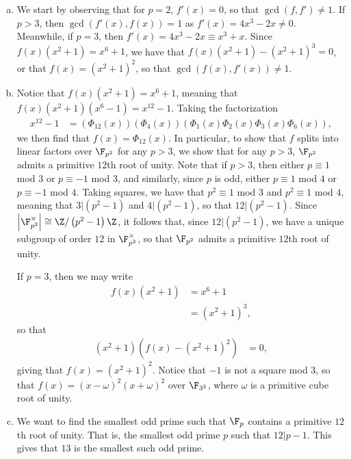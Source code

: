 \documentclass[10pt]{mypackage}
\begin{document}
\begin{solution}\hfill
  \begin{enumerate}[(a)]
    \item We start by observing that for $p = 2$, $f'(x) = 0$, so that $\gcd\left( f,f' \right)\neq 1$. If $p > 3$, then $\gcd\left( f'(x),f(x) \right) = 1$ as $f'(x) = 4x^3-2x\neq 0$. Meanwhile, if $p = 3$, then $f'(x) = 4x^3-2x \equiv x^3 + x$. Since $f(x)\left( x^2 + 1 \right) = x^{6}+1$, we have that $f(x)\left( x^2+1 \right)-\left( x^2+1 \right)^{3} = 0$, or that $f(x) = \left( x^2+1 \right)^{2}$, so that $\gcd\left( f(x),f'(x) \right) \neq 1$.
    \item Notice that $f(x)\left( x^2+1 \right) = x^{6}+1$, meaning that $f(x)\left( x^2+1 \right)\left( x^6-1 \right) = x^{12}-1$. Taking the factorization
      \begin{align*}
        x^{12}-1 &= \left( \Phi_{12}(x) \right)\left( \Phi_4(x) \right)\left( \Phi_1(x)\Phi_2(x)\Phi_3(x)\Phi_6(x) \right),
      \end{align*}
      we then find that $f(x) = \Phi_{12}(x)$. In particular, to show that $f$ splits into linear factors over $\F_{p^2}$ for any $p > 3$, we show that for any $p > 3$, $\F_{p^2}$ admits a primitive $12$th root of unity. Note that if $p > 3$, then either $p\equiv 1$ mod $3$ or $p\equiv -1$ mod $3$, and similarly, since $p$ is odd, either $p\equiv 1$ mod $4$ or $p\equiv -1$ mod $4$. Taking squares, we have that $p^2\equiv 1$ mod $3$ and $p^2\equiv 1$ mod $4$, meaning that $3 | \left( p^2-1 \right)$ and $4 | \left( p^2-1 \right)$, so that $12 | \left( p^2-1 \right)$. Since $ \left\vert \F_{p^2}^{\times} \right\vert \cong \Z/\left( p^2-1 \right)\Z$, it follows that, since $12 | \left( p^2-1 \right)$, we have a unique subgroup of order $12$ in $\F_{p^2}^{\times}$, so that $\F_{p^2}$ admits a primitive $12$th root of unity.

      If $p = 3$, then we may write
      \begin{align*}
        f(x)\left( x^2+1 \right) &= x^{6} + 1\\
                                 &= \left( x^2 + 1 \right)^{3},
      \end{align*}
      so that
      \begin{align*}
        \left( x^{2}+1 \right)\left( f(x)-\left( x^2+1 \right)^{2} \right) &= 0,
      \end{align*}
      giving that $f(x) = \left( x^2+1 \right)^{2}$. Notice that $-1$ is not a square mod $3$, so that $f(x) = \left( x-\omega \right)^2\left( x+\omega \right)^2$ over $\F_{3^2}$, where $\omega$ is a primitive cube root of unity.
    \item We want to find the smallest odd prime such that $\F_p$ contains a primitive $12$th root of unity. That is, the smallest odd prime $p$ such that $12 | p-1$. This gives that $13$ is the smallest such odd prime.
  \end{enumerate}
\end{solution}
\end{document}
